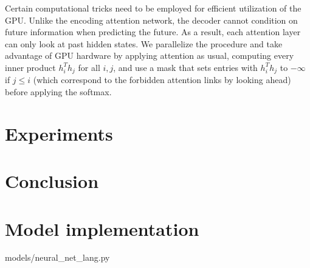 \documentclass[12pt]{article}
\begin{document}
Certain computational tricks need to be employed for efficient utilization of
the GPU. Unlike the encoding attention network, the decoder cannot condition on
future information when predicting the future. As a result, each attention layer
can only look at past hidden states. We parallelize the procedure and take
advantage of GPU hardware by applying attention as usual, computing every
inner product $h_i^T h_j$ for all $i,j$, and use a mask that sets entries with
$h_i^T h_j$
to $-\infty$ if $j \le i$ (which correspond to the forbidden attention
links by looking ahead) before applying the softmax. 

\section{Experiments}
\section{Conclusion}





\appendix
\section{Model implementation}



{models/neural_net_lang.py}



\end{document}
